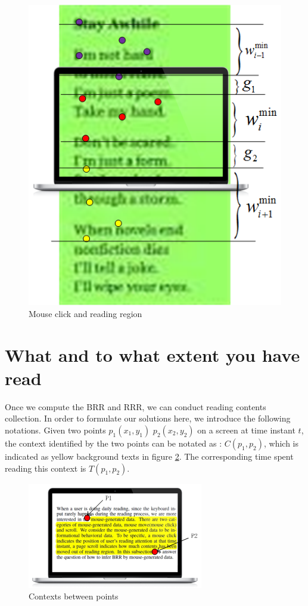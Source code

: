 \documentclass{sigchi}
\begin{document}
\begin{figure}[!h]
\centering
\includegraphics[width=0.9\columnwidth]{pictures/neighbor-scroll}
\caption{Mouse click and reading region}
\label{fig:neighbor_scroll}
\end{figure}

\section{ What and to what extent you have read}
Once we compute the BRR and RRR, we can conduct reading contents collection. In order to formulate our solutions here, we introduce the following 
notations. Given two points $p_1(x_1,y_1)$ $p_2(x_2,y_2)$  on a screen at time instant $t$, the context identified by the two points can be 
notated as : $C(p_1,p_2)$, which is indicated as yellow background texts in figure \ref{fig:context_points}. The corresponding time spent reading  
this context is $T(p_1,p_2)$.  

\begin{figure}[!h]
\centering
\includegraphics[width=0.9\columnwidth]{pictures/contexts-in-points}
\caption{Contexts between points}
\label{fig:context_points}
\end{figure}
\end{document}
